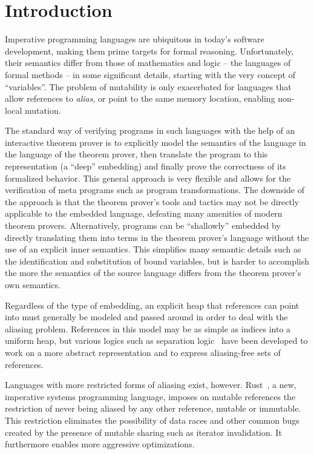\section{Introduction}

Imperative programming languages are ubiquitous in today's software development,
making them prime targets for formal reasoning. Unfortunately, their semantics
differ from those of mathematics and logic -- the languages of formal methods -- in some
significant details, starting with the very concept of ``variables''. The problem
of mutability is only exacerbated for languages that allow references to
\emph{alias}, or point to the same memory location, enabling non-local mutation.

The standard way of verifying programs in such languages with the help of an
interactive theorem prover is to explicitly model the semantics of the language
in the language of the theorem prover, then translate
the program to this representation (a ``deep'' embedding) and finally prove the
correctness of its formalized behavior. This general approach is very flexible
and allows for the verification of meta programs such as program transformations.
The downside of the approach is that the theorem prover's tools and tactics may
not be directly applicable to the embedded language, defeating many amenities of
modern theorem provers.
Alternatively, programs can be ``shallowly'' embedded by directly translating them
into terms in the theorem prover's language without the use of an explicit inner semantics.
This simplifies many semantic details such as the identification and
substitution of bound variables, but is harder to accomplish the more the semantics
of the source language differs from the theorem prover's own semantics.

Regardless of the type of embedding,
an explicit heap that references can point into must generally be modeled and
passed around in order to deal with the aliasing problem. References in this model may be as simple as
indices into a uniform heap, but various logics such as separation logic~\cite{reynolds2002separation} have been developed to work on a more abstract representation and to express
aliasing-free sets of references.

Languages with more restricted forms of aliasing exist, however.
Rust~\cite{matsakis2014rust}, a new, imperative systems programming language,
imposes on mutable references the restriction of never being aliased by any
other reference, mutable or immutable. This restriction eliminates the
possibility of data races and other common bugs created by the presence of
mutable sharing such as iterator invalidation. It furthermore enables more
aggressive optimizations.

